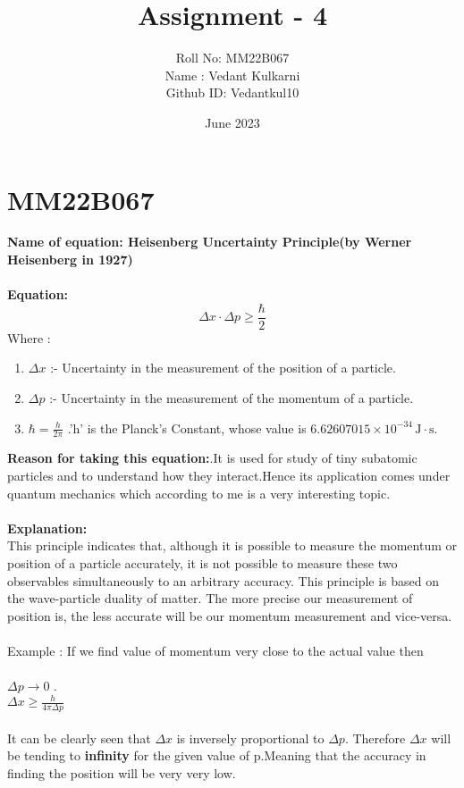 \documentclass{article}
\title{Assignment - 4}
\author{Roll No: MM22B067 \\ Name : Vedant Kulkarni \\ Github ID: Vedantkul10}
\date{June 2023}
\begin{document}
\maketitle

\section*{MM22B067}
\textbf{Name of equation: Heisenberg Uncertainty Principle(by Werner Heisenberg in 1927)}
\\ \\
\textbf{Equation:}
\[
\Delta x \cdot \Delta p \geq \frac{\hbar}{2}
\]
Where :
\\
\begin{enumerate}
  \item  \(\Delta x\) :- Uncertainty in the measurement of the position of a particle.
  \item \(\Delta p\) :- Uncertainty in the measurement of the momentum of a particle.
  \item $\hbar = \frac{h}{2\pi}$ .'h' is the Planck's Constant, whose value is $6.62607015 \times 10^{-34} \, \mathrm{J} \cdot \mathrm{s}$.
  \\

\end{enumerate}
\textbf{Reason for taking this equation:}.It is used for study of tiny subatomic particles and to understand how they interact.Hence its application comes under quantum mechanics which according to me is a very interesting topic.
\\ \\
\textbf{Explanation:}
\\
This principle indicates that, although it is possible to measure the momentum or position of a particle accurately, it is not possible to measure these two observables simultaneously to an arbitrary accuracy. This principle is based on the wave-particle duality of matter. \cite{principle}
The more precise our measurement of position is, the less accurate will be our momentum measurement and vice-versa. 
\\ \\
Example : If we find value of momentum very close to the actual value then \\
\\ \(\Delta p \rightarrow 0\) . 
\\ \(\Delta x \geq \frac{h}{4\pi \Delta p}\)
\\ \\
It can be clearly seen that \(\Delta x\) is inversely proportional to \(\Delta p\). Therefore \(\Delta x\) will be tending to \textbf{infinity} for the given value of p.Meaning that the accuracy in finding the position will be very very low.


\end{document}
